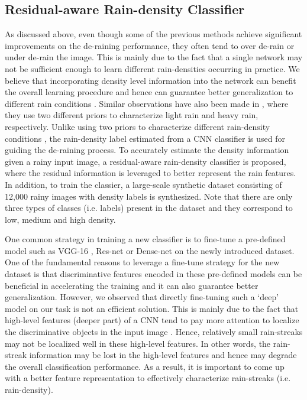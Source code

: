 \documentclass[10pt,twocolumn,letterpaper]{article}
\begin{document}
\subsection{Residual-aware Rain-density Classifier}
As discussed above, even though some of the previous methods achieve significant improvements on the de-raining performance, they often tend to over de-rain or under de-rain the image.   This is mainly due to the fact that a single network may not be sufficient enough to learn different rain-densities occurring in practice.  We believe that incorporating density level information into the network can benefit the overall learning procedure and hence can guarantee better generalization to different rain conditions \cite{derain_cvpr17_video}.  Similar observations have also been made in \cite{derain_cvpr17_video}, where they use two different  priors to characterize light rain  and heavy rain, respectively.  Unlike using two priors to characterize different rain-density conditions \cite{derain_cvpr17_video}, the rain-density label estimated from a CNN classifier is used for guiding the de-raining process.  To  accurately estimate the density information given a rainy input image, a residual-aware rain-density classifier is proposed, where the residual information is leveraged  to better represent the rain features. In addition, to train the classier, a large-scale synthetic dataset  consisting of 12,000 rainy images with density labels is synthesized.  Note that there are only three types of classes (i.e. labels) present in the dataset and they correspond to low, medium and high density.  


One common strategy in training a new classifier is to fine-tune a pre-defined  model such as VGG-16 \cite{vgg}, Res-net \cite{deep_residue} or Dense-net \cite{dense_net} on the newly introduced dataset. One of  the fundamental reasons to leverage a fine-tune strategy for the new dataset is that discriminative features encoded in these pre-defined models can be beneficial in accelerating the training  and it can also guarantee better generalization.  However, we observed that directly fine-tuning such a `deep' model on our task is not an efficient solution.   This is mainly due to the fact that high-level features (deeper part) of a CNN tend to pay more attention to localize the discriminative objects in the input image \cite{feature_vis_bolei}.  Hence, relatively small rain-streaks may not be localized well in these high-level features. In other words, the rain-streak information may be lost in the high-level features and hence may degrade the overall classification performance. As a result, it is important to come up with a better feature representation to effectively characterize rain-streaks (i.e. rain-density).   
\end{document}
